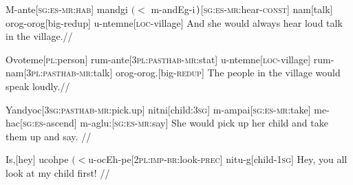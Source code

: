 \documentclass[12pt]{article}
\begin{document}
\exdisplay\begingl
M-ante[\textsc{sg:es-mr:hab}]
{mandgi $(<$ m-andEg-i$\mskip2mu)$}[\textsc{sg:es-mr:}hear-\textsc{const}]
nam[talk]
orog-orog[big-\sc redup]
u-ntemne[\textsc{loc}-village]
\endilg
\glft And she would always hear loud talk in the village.//
\endgl
\xe

\exdisplay
\begingl
Ovoteme[\textsc{pl}:person]
rum-ante[\textsc{3pl:pasthab-mr:}stat]
u-ntemne[\textsc{loc}-village]
rum-nam[\textsc{3pl:pasthab-mr:}talk]
orog-orog.[big-\textsc{redup}]
\endilg
\glft The people in the village would speak loudly.//
\endgl
\xe

\exdisplay
\begingl
Yandyoc[\textsc{3sg:pasthab-mr:}pick.up]
nitni[child:\textsc{3sg}]
m-ampai[\textsc{sg:es-mr:}take]
me-hac[\textsc{sg:es-}ascend]
m-aglu:[\textsc{sg:es-mr:}say]
\endilg
\glft She would pick up her child and take them up and say. //
\endgl
\xe

\exdisplay
\begingl
Is,[hey]
{ucohpe $(<$u-ocEh-pe}[\textsc{2pl:imp-br:}look\textsc{-prec}]
nitu-g[child\textsc{-1sg}]
\endilg
\glft Hey, you all look at my child first! //
\endgl
\xe
\end{document}
